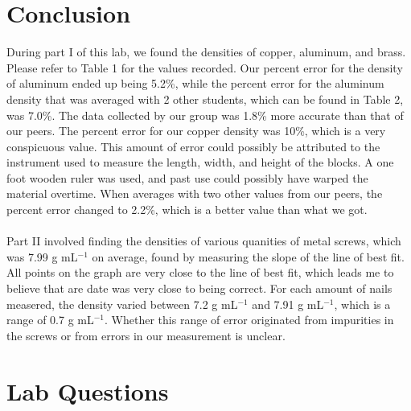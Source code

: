 \documentclass{article}
\begin{document}
\section{Conclusion}

During part I of this lab, we found the densities of copper, aluminum, and brass. Please refer to Table 1 for the values recorded. Our percent error for the density of aluminum ended up being 5.2\%, while the percent error for the aluminum density that was averaged with 2 other students, which can be found in Table 2, was 7.0\%. The data collected by our group was 1.8\% more accurate than that of our peers. The percent error for our copper density was 10\%, which is a very conspicuous value. This amount of error could possibly be attributed to the instrument used to measure the length, width, and height of the blocks. A one foot wooden ruler was used, and past use could possibly have warped the material overtime. When averages with two other values from our peers, the percent error changed to 2.2\%, which is a better value than what we got.
\\\\
Part II involved finding the densities of various quanities of metal screws, which was 7.99 g mL$^{-1}$ on average, found by measuring the slope of the line of best fit. All points on the graph are very close to the line of best fit, which leads me to believe that are date was very close to being correct. For each amount of nails measered, the density varied between 7.2  g mL$^{-1}$ and 7.91  g mL$^{-1}$, which is a range of 0.7 g mL$^{-1}$. Whether this range of error originated from impurities in the screws or from errors in our measurement is unclear.

\newpage

\section{Lab Questions}
\end{document}
